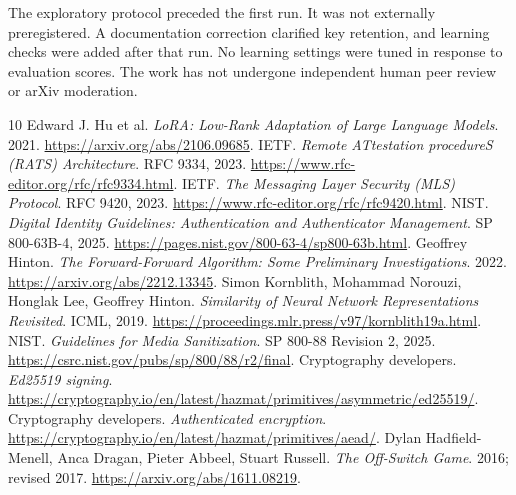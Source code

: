 \documentclass[11pt]{article}
\begin{document}
The exploratory protocol preceded the first run.
It was not externally preregistered.
A documentation correction clarified key retention, and learning checks were added after that run.
No learning settings were tuned in response to evaluation scores.
The work has not undergone independent human peer review or arXiv moderation.

\begin{thebibliography}{10}
 Edward J. Hu et al. \emph{LoRA: Low-Rank Adaptation of Large Language Models}. 2021. \url{https://arxiv.org/abs/2106.09685}.
 IETF. \emph{Remote ATtestation procedureS (RATS) Architecture}. RFC 9334, 2023. \url{https://www.rfc-editor.org/rfc/rfc9334.html}.
 IETF. \emph{The Messaging Layer Security (MLS) Protocol}. RFC 9420, 2023. \url{https://www.rfc-editor.org/rfc/rfc9420.html}.
 NIST. \emph{Digital Identity Guidelines: Authentication and Authenticator Management}. SP 800-63B-4, 2025. \url{https://pages.nist.gov/800-63-4/sp800-63b.html}.
 Geoffrey Hinton. \emph{The Forward-Forward Algorithm: Some Preliminary Investigations}. 2022. \url{https://arxiv.org/abs/2212.13345}.
 Simon Kornblith, Mohammad Norouzi, Honglak Lee, Geoffrey Hinton. \emph{Similarity of Neural Network Representations Revisited}. ICML, 2019. \url{https://proceedings.mlr.press/v97/kornblith19a.html}.
 NIST. \emph{Guidelines for Media Sanitization}. SP 800-88 Revision 2, 2025. \url{https://csrc.nist.gov/pubs/sp/800/88/r2/final}.
 Cryptography developers. \emph{Ed25519 signing}. \url{https://cryptography.io/en/latest/hazmat/primitives/asymmetric/ed25519/}.
 Cryptography developers. \emph{Authenticated encryption}. \url{https://cryptography.io/en/latest/hazmat/primitives/aead/}.
 Dylan Hadfield-Menell, Anca Dragan, Pieter Abbeel, Stuart Russell. \emph{The Off-Switch Game}. 2016; revised 2017. \url{https://arxiv.org/abs/1611.08219}.
\end{thebibliography}
\end{document}
